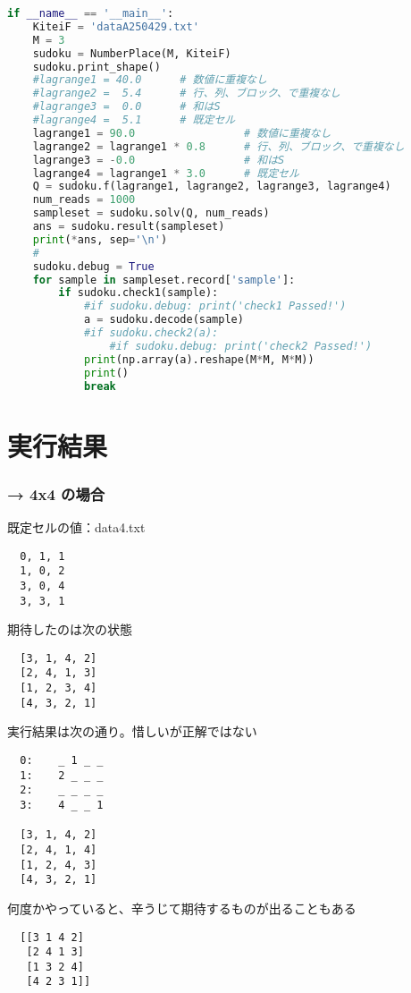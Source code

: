 \documentclass[uplatex,dvipdfmx,a4paper,11pt,oneside,openany]{jsbook}
\begin{document}
\begin{lstlisting}[language=Python]
if __name__ == '__main__':
    KiteiF = 'dataA250429.txt'
    M = 3
    sudoku = NumberPlace(M, KiteiF)
    sudoku.print_shape()
    #lagrange1 = 40.0      # 数値に重複なし
    #lagrange2 =  5.4      # 行、列、ブロック、で重複なし
    #lagrange3 =  0.0      # 和はS
    #lagrange4 =  5.1      # 既定セル
    lagrange1 = 90.0                 # 数値に重複なし
    lagrange2 = lagrange1 * 0.8      # 行、列、ブロック、で重複なし
    lagrange3 = -0.0                 # 和はS
    lagrange4 = lagrange1 * 3.0      # 既定セル
    Q = sudoku.f(lagrange1, lagrange2, lagrange3, lagrange4)
    num_reads = 1000
    sampleset = sudoku.solv(Q, num_reads)
    ans = sudoku.result(sampleset)
    print(*ans, sep='\n')
    #
    sudoku.debug = True
    for sample in sampleset.record['sample']:
        if sudoku.check1(sample):
            #if sudoku.debug: print('check1 Passed!')
            a = sudoku.decode(sample)
            #if sudoku.check2(a):
                #if sudoku.debug: print('check2 Passed!')
            print(np.array(a).reshape(M*M, M*M))
            print()
            break
\end{lstlisting}


\section{実行結果}

\subsubsection{→ 4x4 の場合}

既定セルの値：data4.txt
\begin{verbatim}
  0, 1, 1
  1, 0, 2
  3, 0, 4
  3, 3, 1
\end{verbatim}

期待したのは次の状態
\begin{verbatim}
  [3, 1, 4, 2]
  [2, 4, 1, 3]
  [1, 2, 3, 4]
  [4, 3, 2, 1]
\end{verbatim}

実行結果は次の通り。惜しいが正解ではない
\begin{verbatim}
  0:	_ 1 _ _
  1:	2 _ _ _
  2:	_ _ _ _
  3:	4 _ _ 1

  [3, 1, 4, 2]
  [2, 4, 1, 4]
  [1, 2, 4, 3]
  [4, 3, 2, 1]
\end{verbatim}

何度かやっていると、辛うじて期待するものが出ることもある
\begin{verbatim}
  [[3 1 4 2]
   [2 4 1 3]
   [1 3 2 4]
   [4 2 3 1]]
\end{verbatim}
\end{document}
